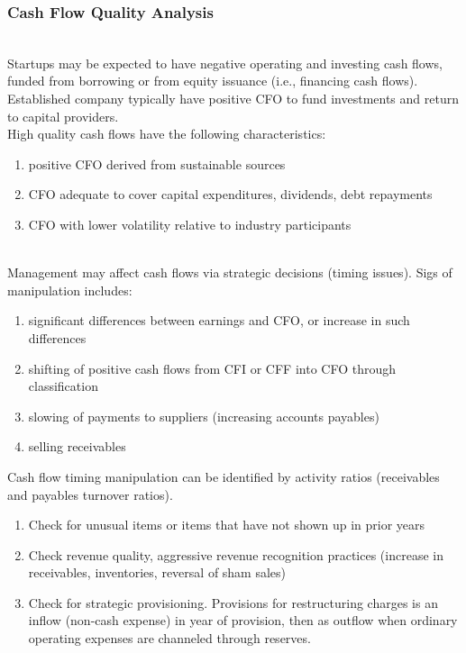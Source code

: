 \subsubsection{Cash Flow Quality Analysis}

\begin{remark} \\
Startups may be expected to have negative operating and investing cash flows, funded from borrowing or from equity issuance (i.e., financing cash flows).\\
Established company typically have positive CFO to fund investments and return to capital providers.\\
High quality cash flows have the following characteristics: 
\begin{enumerate}[label=\roman*.]
\setlength{\itemsep}{0pt}
\item positive CFO derived from sustainable sources
\item CFO adequate to cover capital expenditures, dividends, debt repayments
\item CFO with lower volatility relative to industry participants
\end{enumerate}
\end{remark}

\begin{remark} \\
Management may affect cash flows via strategic decisions (timing issues). Sigs of manipulation includes:
\begin{enumerate}[label=\roman*.]
\setlength{\itemsep}{0pt}
\item significant differences between earnings and CFO, or increase in such differences
\item shifting of positive cash flows from CFI or CFF into CFO through classification
\item slowing of payments to suppliers (increasing accounts payables)
\item selling receivables
\end{enumerate}
Cash flow timing manipulation can be identified by activity ratios (receivables and payables turnover ratios).
\end{remark}

\begin{method} 
\begin{enumerate}[label=\roman*.]
\setlength{\itemsep}{0pt}
\item Check for unusual items or items that have not shown up in prior years
\item Check revenue quality, aggressive revenue recognition practices (increase in receivables, inventories, reversal of sham sales)
\item Check for strategic provisioning. Provisions for restructuring charges is an inflow (non-cash expense) in year of provision, then as outflow when ordinary operating expenses are channeled through reserves.
\end{enumerate}
\end{method}

